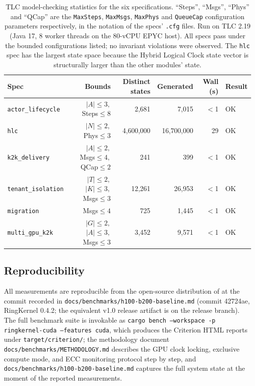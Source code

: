 \begin{table}[htbp]
\centering
\small
\setlength{\tabcolsep}{4pt}
\begin{tabular}{lrrrrl}
\toprule
Spec & Bounds & Distinct states & Generated & Wall (s) & Result \\
\midrule
\texttt{actor\_lifecycle} & $|A|{\le}3,$ Steps${\le}8$              &   2{,}681 &   7{,}015 & $<$1 & OK \\
\texttt{hlc}              & $|N|{\le}2,$ Phys${\le}3$               & 4{,}600{,}000 & 16{,}700{,}000 &   29 & OK \\
\texttt{k2k\_delivery}    & $|A|{\le}2,$ Msgs${\le}4,$ QCap${\le}2$ &     241 &     399 & $<$1 & OK \\
\texttt{tenant\_isolation}& $|T|{\le}2,$ $|K|{\le}3,$ Msgs${\le}3$ & 12{,}261 & 26{,}953 & $<$1 & OK \\
\texttt{migration}        & Msgs${\le}4$                            &     725 &   1{,}445 & $<$1 & OK \\
\texttt{multi\_gpu\_k2k}  & $|G|{\le}2,$ $|A|{\le}3,$ Msgs${\le}3$ &   3{,}452 &   9{,}571 & $<$1 & OK \\
\bottomrule
\end{tabular}
\caption{TLC model-checking statistics for the six \TLA{}
specifications.  ``Steps'', ``Msgs'', ``Phys'' and ``QCap'' are
the \texttt{MaxSteps}, \texttt{MaxMsgs}, \texttt{MaxPhys} and
\texttt{QueueCap} configuration parameters respectively, in the
notation of the specs' \texttt{.cfg} files.  Run on TLC 2.19
(Java 17, 8 worker threads on the 80-vCPU EPYC host).  All specs
pass under the bounded configurations listed; no invariant
violations were observed.  The \texttt{hlc} spec has the largest
state space because the Hybrid Logical Clock state vector is
structurally larger than the other modules' state.}
\label{tab:tlc-stats}
\end{table}

\subsection{Reproducibility}
\label{sec:eval:repro}

All measurements are reproducible from the open-source distribution
of \system{} at the commit recorded in
\texttt{docs/benchmarks/h100-b200-baseline.md} (commit 42724ae,
RingKernel 0.4.2; the equivalent v1.0 release artifact is on the
release branch).  The full benchmark suite is invokable as
\texttt{cargo bench --workspace -p ringkernel-cuda --features cuda},
which produces the Criterion HTML reports under
\texttt{target/criterion/}; the methodology document
\texttt{docs/benchmarks/METHODOLOGY.md} describes the GPU clock
locking, exclusive compute mode, and ECC monitoring protocol step
by step, and \texttt{docs/benchmarks/h100-b200-baseline.md} captures
the full system state at the moment of the reported measurements.
